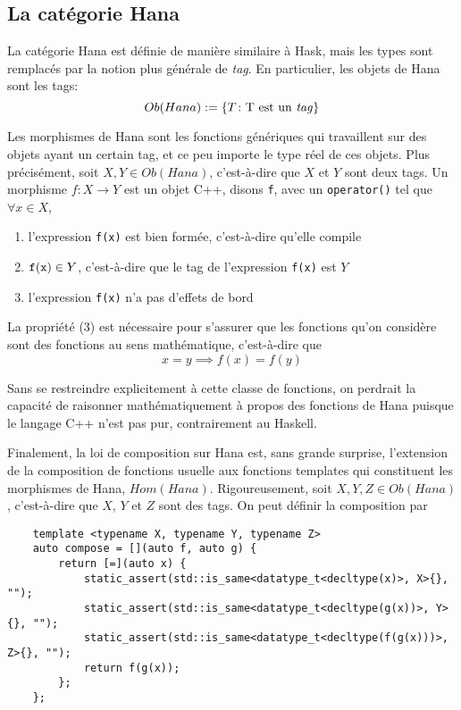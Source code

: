 \subsection{La catégorie Hana}
La catégorie Hana est définie de manière similaire à Hask, mais les types
sont remplacés par la notion plus générale de \textit{tag}. En particulier,
les objets de Hana sont les tags:
\[
    Ob(Hana) := \{ T \colon \text{T est un \textit{tag}} \}
\]

Les morphismes de Hana sont les fonctions génériques qui travaillent sur des
objets ayant un certain tag, et ce peu importe le type réel de ces objets.
Plus précisément, soit $X, Y \in Ob(Hana)$, c'est-à-dire que $X$ et $Y$
sont deux tags. Un morphisme $f : X \to Y$ est un objet C++, disons {\tt f},
avec un {\tt operator()} tel que $\forall x \in X$,
\begin{enumerate}
    \item l'expression {\tt f(x)} est bien formée, c'est-à-dire qu'elle compile
    \item ${\tt f(x)} \in Y$, c'est-à-dire que le tag de l'expression {\tt f(x)} est $Y$
    \item l'expression {\tt f(x)} n'a pas d'effets de bord
\end{enumerate}

La propriété (3) est nécessaire pour s'assurer que les fonctions qu'on
considère sont des fonctions au sens mathématique, c'est-à-dire que
\[
    x = y \implies f(x) = f(y)
\]

Sans se restreindre explicitement à cette classe de fonctions, on perdrait la
capacité de raisonner mathématiquement à propos des fonctions de Hana puisque
le langage C++ n'est pas pur, contrairement au Haskell.

Finalement, la loi de composition sur Hana est, sans grande surprise,
l'extension de la composition de fonctions usuelle aux fonctions templates
qui constituent les morphismes de Hana, $Hom(Hana)$. Rigoureusement, soit
$X, Y, Z \in Ob(Hana)$, c'est-à-dire que $X$, $Y$ et $Z$ sont des tags.
On peut définir la composition par
\begin{verbatim}
    template <typename X, typename Y, typename Z>
    auto compose = [](auto f, auto g) {
        return [=](auto x) {
            static_assert(std::is_same<datatype_t<decltype(x)>, X>{}, "");
            static_assert(std::is_same<datatype_t<decltype(g(x))>, Y>{}, "");
            static_assert(std::is_same<datatype_t<decltype(f(g(x)))>, Z>{}, "");
            return f(g(x));
        };
    };
\end{verbatim}

